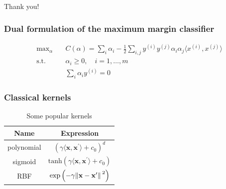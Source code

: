 \documentclass{beamer}
\begin{document}
    \begin{frame}[noframenumbering]
        
        \centering
        Thank you!
        
        
    \end{frame}
    
    \begin{frame}[noframenumbering]
        \frametitle{Dual formulation of the maximum margin classifier}
        
        \begin{align*}
            \mathrm{max}_\alpha \quad & C\left( \alpha \right) = \sum_i \alpha_i - \frac{1}{2}\sum_{i,j} y^{(i)}y^{(j)}\alpha_i\alpha_j \langle x^{(i)}, x^{(j)}\rangle\\
            \mathrm{s.t.}\quad & \alpha_i \geq 0, \quad i=1,\dots, m\\
            & \sum_i \alpha_i y^{(i)} = 0
        \end{align*}
        
    \end{frame}
    

    \begin{frame}[noframenumbering]
        \frametitle{Classical kernels}
    
        \begin{table}[htbp]
            \centering
            \begin{tabular}{cc}
                \toprule
                Name & Expression\\
                \midrule
                polynomial & $ \left( \gamma\langle \mathbf{x}, \mathbf{x}^\prime \rangle + c_0 \right)^d$\\
                sigmoid & $\mathrm{tanh}\left( \gamma\langle \mathbf{x}, \mathbf{x}^\prime\rangle + c_0 \right)$\\
                RBF & $\mathrm{exp}\left( -\gamma \norm*{\mathbf{x} - \mathbf{x}^\prime}^2 \right)$\\
                \bottomrule

            \end{tabular}
            \caption{Some popular kernels}
        \end{table}
    
    \end{frame}
\end{document}
